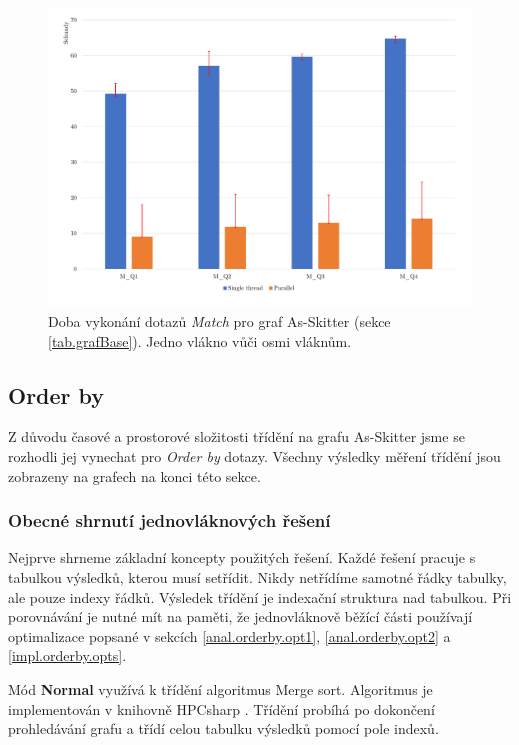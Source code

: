 \begin{figure}[!htp]
\includegraphics[width=\linewidth]{../img/skitterMatch.pdf}\centering
\caption{Doba vykonání dotazů \textit{Match} pro graf As-Skitter (sekce \ref{tab.grafBase}). Jedno vlákno vůči osmi vláknům.}
\label{figure.skitterMatch}
\end{figure}


\subsection{Order by}

Z důvodu časové a prostorové složitosti třídění na grafu As-Skitter jsme se rozhodli jej vynechat pro \textit{Order by} dotazy.
Všechny výsledky měření třídění jsou zobrazeny na grafech na konci této sekce.

\subsubsection{Obecné shrnutí jednovláknových řešení}

Nejprve shrneme základní koncepty použitých řešení.
Každé řešení pracuje s tabulkou výsledků, kterou musí setřídit.
Nikdy netřídíme samotné řádky tabulky, ale pouze indexy řádků.
Výsledek třídění je indexační struktura nad tabulkou.
Při porovnávání je nutné mít na paměti, že jednovláknově běžící části používají optimalizace popsané v sekcích \ref{anal.orderby.opt1}, \ref{anal.orderby.opt2} a \ref{impl.orderby.opts}.  

Mód \textbf{Normal} využívá k třídění algoritmus Merge sort.
Algoritmus je implementován v knihovně HPCsharp \citep{hpcsharp}.
Třídění probíhá po dokončení prohledávání grafu a třídí celou tabulku výsledků pomocí pole indexů.


